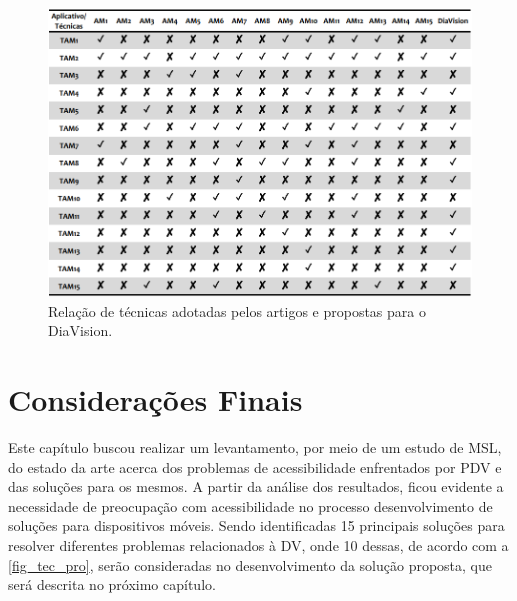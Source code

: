 \begin{figure}[htb]
      \caption{\label{fig_tec_pro}Relação de técnicas adotadas pelos artigos e propostas para o DiaVision.}
      \begin{center}
            \includegraphics[scale=0.68]{Imagens/proposta/tecnicas_propostas.png}
      \end{center}
\end{figure}

\section{Considerações Finais}

Este capítulo buscou realizar um levantamento, por meio de um estudo de MSL, do estado da arte
acerca dos problemas de acessibilidade enfrentados por PDV e das soluções para os mesmos.
A partir da análise dos resultados, ficou evidente a necessidade de preocupação com
acessibilidade no processo desenvolvimento de soluções para dispositivos móveis.
Sendo identificadas 15 principais soluções para resolver diferentes problemas relacionados à DV,
onde 10 dessas, de acordo com a \autoref{fig_tec_pro}, serão consideradas no desenvolvimento da solução proposta,
que será descrita no próximo capítulo.